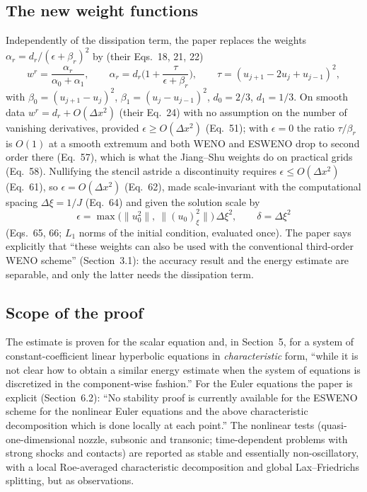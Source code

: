 \documentclass[english,a4paper]{my_memo}
\begin{document}
\subsection{The new weight functions}

Independently of the dissipation term, the paper replaces the
\citet{Jiang1996} weights $\alpha_r = d_r/(\epsilon + \beta_r)^2$ by
(their Eqs.~18, 21, 22)
\begin{equation}
  w^{r} = \frac{\alpha_r}{\alpha_0 + \alpha_1},\qquad
  \alpha_r = d_r\Big(1 + \frac{\tau}{\epsilon + \beta_r}\Big),\qquad
  \tau = (u_{j+1} - 2u_j + u_{j-1})^2,
  \label{eq:weights}
\end{equation}
with $\beta_0 = (u_{j+1}-u_j)^2$, $\beta_1 = (u_j - u_{j-1})^2$,
$d_0 = 2/3$, $d_1 = 1/3$. On smooth data $w^{r} = d_r + O(\Delta x^2)$ (their
Eq.~24) with no assumption on the number of vanishing derivatives, provided
$\epsilon \ge O(\Delta x^2)$ (Eq.~51); with $\epsilon = 0$ the ratio
$\tau/\beta_r$ is $O(1)$ at a smooth extremum and both WENO and ESWENO drop
to second order there (Eq.~57), which is what the Jiang--Shu weights do on
practical grids (Eq.~58). Nullifying the stencil astride a discontinuity
requires $\epsilon \le O(\Delta x^2)$ (Eq.~61), so $\epsilon = O(\Delta x^2)$
(Eq.~62), made scale-invariant with the computational spacing
$\Delta\xi = 1/J$ (Eq.~64) and given the solution scale by
\begin{equation}
  \epsilon = \max\big(\|u_0^2\|,\ \|(u_0)_\xi^2\|\big)\,\Delta\xi^2,\qquad
  \delta = \Delta\xi^2
\end{equation}
(Eqs.~65, 66; $L_1$ norms of the initial condition, evaluated once). The
paper says explicitly that ``these weights can also be used with the
conventional third-order WENO scheme'' (Section~3.1): the accuracy result
and the energy estimate are separable, and only the latter needs the
dissipation term.

\subsection{Scope of the proof}

The estimate is proven for the scalar equation and, in Section~5, for a
system of constant-coefficient linear hyperbolic equations in
\emph{characteristic} form, ``while it is not clear how to obtain a similar
energy estimate when the system of equations is discretized in the
component-wise fashion.'' For the Euler equations the paper is explicit
(Section~6.2): ``No stability proof is currently available for the ESWENO
scheme for the nonlinear Euler equations and the above characteristic
decomposition which is done locally at each point.'' The nonlinear tests
(quasi-one-dimensional nozzle, subsonic and transonic; time-dependent
problems with strong shocks and contacts) are reported as stable and
essentially non-oscillatory, with a local Roe-averaged characteristic
decomposition and global Lax--Friedrichs splitting, but as observations.
\end{document}
